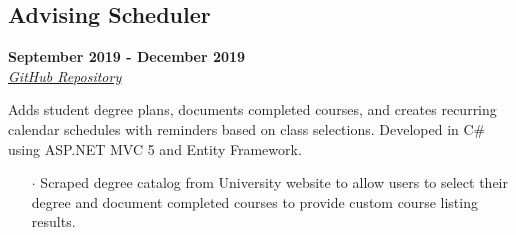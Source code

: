 \documentclass[10pt]{article}
\begin{document}
\begin{paracol}{2}
    \begin{leftcolumn} \vspace{-.36cm}
        \sloppy
        \subsection*{Advising Scheduler}
        \textbf{September 2019 - December 2019} \\
        \textit{\href{https://github.com/javiSauce/DBU-Advising-Scheduler}{\underline{GitHub Repository}}}
    \end{leftcolumn}

    \begin{rightcolumn}
        \begin{flushleft} \vspace{-1.2mm}           
            Adds student degree plans, documents completed courses, and creates recurring calendar schedules with reminders based on class selections. Developed in C\# using ASP.NET MVC 5 and Entity Framework.
        \end{flushleft}
        \vspace{-.6cm}
        \begin{itemize}[leftmargin=.28cm, itemsep=1pt]
            \item[$\cdot$] Scraped degree catalog from University website to allow users to select their degree and document completed courses to provide custom course listing results.
        \end{itemize}
    \end{rightcolumn}
\end{paracol}

\vspace{-.2cm}
\end{document}
